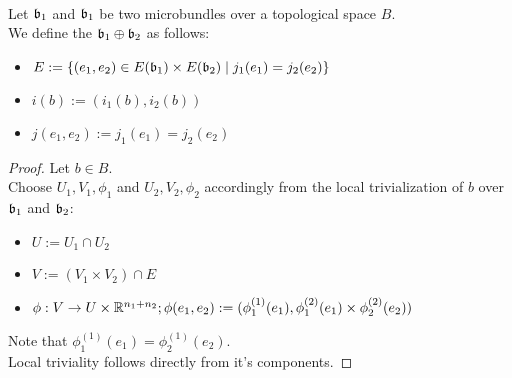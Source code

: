 \\ Let $\mathfrak{b}_1$ and $\mathfrak{b}_1$ be two microbundles over a topological space $B$.
\\ We define the  $\mathfrak{b}_1 \oplus \mathfrak{b}_2$ as follows:
\begin{itemize}
    \item $E := \{ (e_1, e_2) \in E(\mathfrak{b}_1) \times E(\mathfrak{b}_2) \mid j_1(e_1) = j_2(e_2)\}$
    \item $i(b) := (i_1(b), i_2(b))$
    \item $j(e_1, e_2) := j_1(e_1) = j_2(e_2)$
\end{itemize}
\begin{proof}
    Let $b \in B$.
    \\ Choose $U_1, V_1, \phi_1$ and $U_2, V_2, \phi_2$ accordingly from the local trivialization of $b$ over $\mathfrak{b}_1$ and $\mathfrak{b}_2$:
    \begin{itemize}
        \item $U := U_1 \cap U_2$
        \item $V := (V_1 \times V_2) \cap E$
        \item $\phi: V \to U \times \mathbb{R}^{n_1 + n_2}; \phi(e_1, e_2) := (\phi_1^{(1)}(e_1), \phi_1^{(2)}(e_1) \times  \phi_2^{(2)}(e_2))$
    \end{itemize}
    Note that $\phi_1^{(1)}(e_1) = \phi_2^{(1)}(e_2)$.
    \\ Local triviality follows directly from it's components.
\end{proof}